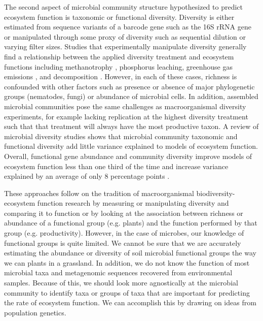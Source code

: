 \documentclass{article}
\begin{document}
The second aspect of microbial community structure hypothesized to predict
ecosystem function is taxonomic or functional
diversity. Diversity is either estimated from sequence variants of a barcode
gene such as the 16S rRNA gene or manipulated through some proxy
of diversity such as sequential dilution or varying filter sizes. Studies that
experimentally manipulate diversity generally find a relationship between
the applied diversity treatment and ecosystem functions including methanotrophy
\citep{schnyder2018}, phosphorus leaching, greenhouse gas emissions
\citep{wagg2014}, and decomposition \citep{maron2018}. However, in each of these
cases, richness is confounded with other factors such as presence or absence of
major phylogenetic groups (nematodes, fungi) or abundance of microbial cells. In
addition, assembled microbial communities pose the same challenges as
macroorganismal diversity experiments, for example lacking replication at the highest
diversity treatment such that that treatment will always have the most
productive taxon. A review of microbial diversity studies shows that
microbial community taxonomic and functional diversity add little variance
explained to models of ecosystem function. Overall, functional gene
abundance and community diversity improve models of ecosystem function less than
one third of the time and increase variance explained by an average of only 8 percentage
points \citep{graham2016}.

These approaches follow on the tradition of macroorganismal
biodiversity-ecosystem function research by measuring or manipulating diversity
and comparing it to function or by looking at the association between richness
or abundance of a functional group (e.g. plants) and the function performed by
that group (e.g. productivity). However, in the case of microbes, our knowledge
of functional groups is quite limited. We cannot be sure that we are accurately
estimating the abundance or diversity of soil microbial functional groups the
way we can plants in a grassland. In addition, we do not know the function of
most microbial taxa and metagenomic sequences recovered from environmental 
samples. Because of this, we should look more
agnostically at the microbial community to identify taxa or groups of taxa that
are important for predicting the rate of ecosystem function. We can accomplish
this by drawing on ideas from population genetics.
\end{document}

